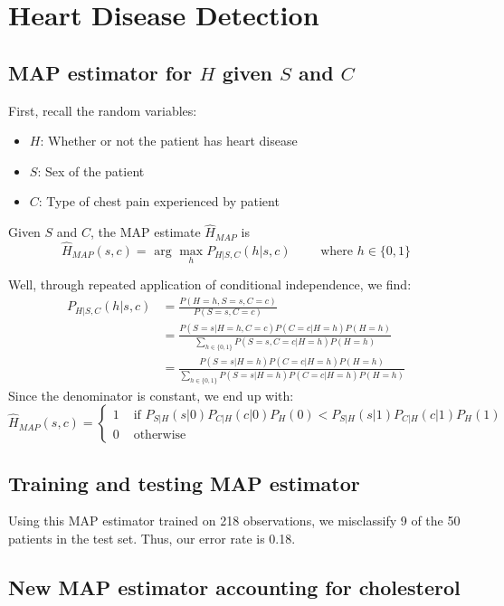 \documentclass[paper=a4, fontsize=11pt]{scrartcl} %
\numberwithin{equation}{section} %
\numberwithin{figure}{section} %
\numberwithin{table}{section} %
\begin{document}
\section{Heart Disease Detection}

\subsection{MAP estimator for $H$ given $S$ and $C$}

First, recall the random variables:
\begin{itemize}
\item $H$: Whether or not the patient has heart disease
\item $S$: Sex of the patient
\item $C$: Type of chest pain experienced by patient
\end{itemize}

Given $S$ and $C$, the MAP estimate $\hat{H}_{MAP}$ is
\[\hat{H}_{MAP}(s,c) = \textrm{ arg } \max_h P_{H | S,C}(h | s,c) \qquad \textrm{ where } h \in \{0,1\}\]

Well, through repeated application of conditional independence, we find:
\begin{align*}
P_{H | S,C}(h | s,c) &= \frac{P(H = h, S = s, C = c)}{P(S = s,  C = c)} \\
   &= \frac{P(S = s | H = h, C = c)P(C = c | H = h)P(H = h)}{\sum_{h \in \{0,1\}}P(S = s,  C = c |  H = h)P(H = h)} \\
   &= \frac{P(S = s | H = h)P(C = c | H = h)P(H = h)}{\sum_{h \in \{0,1\}}P(S = s |  H = h)P(C = c |  H = h)P(H = h)}
\end{align*}
Since the denominator is constant, we end up with:
\[
\hat{H}_{MAP} (s,c) = 
\begin{cases}
1 & \textrm{ if } P_{S|H}(s | 0)P_{C|H}(c | 0)P_H(0) < P_{S|H}(s | 1)P_{C|H}(c | 1)P_H(1) \\
0 & \textrm{ otherwise}
\end{cases}
\]

\subsection{Training and testing MAP estimator}

Using this MAP estimator trained on 218 observations, we misclassify 9 of the 50 patients in the test set. Thus, our error rate is 0.18.

\subsection{New MAP estimator accounting for cholesterol}
\end{document}
